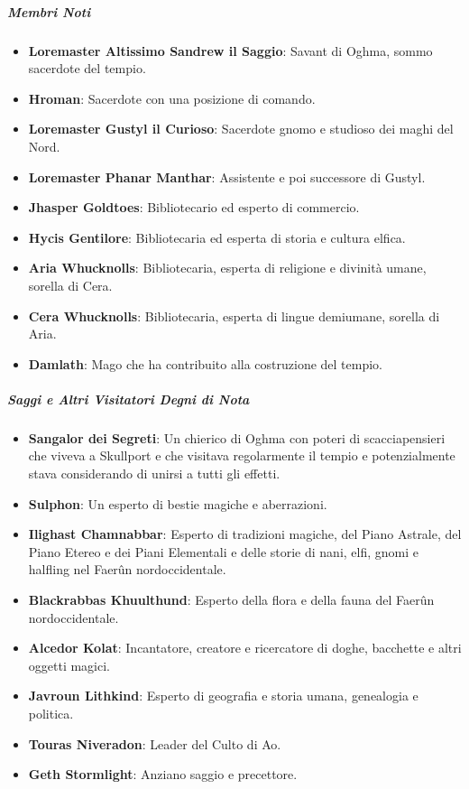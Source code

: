 \documentclass{article}
\begin{document}
                    \subparagraph{Membri Noti} 
                    \begin{itemize}
                      \item \textbf{Loremaster Altissimo Sandrew il Saggio}: Savant di Oghma, sommo sacerdote del tempio.
                      \item \textbf{Hroman}: Sacerdote con una posizione di comando.
                      \item \textbf{Loremaster Gustyl il Curioso}: Sacerdote gnomo e studioso dei maghi del Nord.
                      \item \textbf{Loremaster Phanar Manthar}: Assistente e poi successore di Gustyl.
                      \item \textbf{Jhasper Goldtoes}: Bibliotecario ed esperto di commercio.
                      \item \textbf{Hycis Gentilore}: Bibliotecaria ed esperta di storia e cultura elfica.
                      \item \textbf{Aria Whucknolls}: Bibliotecaria, esperta di religione e divinità umane, sorella di Cera.
                      \item \textbf{Cera Whucknolls}: Bibliotecaria, esperta di lingue demiumane, sorella di Aria.
                      \item \textbf{Damlath}: Mago che ha contribuito alla costruzione del tempio.
                  \end{itemize}
                  \subparagraph{Saggi e Altri Visitatori Degni di Nota}
                  \begin{itemize}
                    \item \textbf{Sangalor dei Segreti}: Un chierico di Oghma con poteri di scacciapensieri che viveva a Skullport e che visitava regolarmente il tempio e potenzialmente stava considerando di unirsi a tutti gli effetti.
                    \item \textbf{Sulphon}: Un esperto di bestie magiche e aberrazioni.
                    \item \textbf{Ilighast Chamnabbar}: Esperto di tradizioni magiche, del Piano Astrale, del Piano Etereo e dei Piani Elementali e delle storie di nani, elfi, gnomi e halfling nel Faerûn nordoccidentale.
                    \item \textbf{Blackrabbas Khuulthund}: Esperto della flora e della fauna del Faerûn nordoccidentale.
                    \item \textbf{Alcedor Kolat}: Incantatore, creatore e ricercatore di doghe, bacchette e altri oggetti magici.
                    \item \textbf{Javroun Lithkind}: Esperto di geografia e storia umana, genealogia e politica.
                    \item \textbf{Touras Niveradon}: Leader del Culto di Ao.
                    \item \textbf{Geth Stormlight}: Anziano saggio e precettore.
                \end{itemize}
\end{document}
